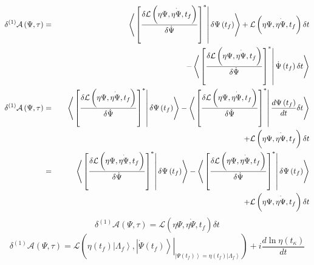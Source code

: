 \documentclass[aps,preprint]{revtex4}
\begin{document}
\begin{eqnarray}
\delta ^{\left( 1\right) }\mathcal{A}\left( \Psi ,\tau \right)
&=&\left\langle \left. \left[ \frac{\delta \mathcal{L}\left( \eta \Psi ,%
\overset{\cdot }{\eta \Psi },t_{f}\right) }{\delta \dot{\Psi}}\right] ^{\ast
}\right\vert \delta \Psi \left( t_{f}\right) \right\rangle +\mathcal{L}%
\left( \eta \Psi ,\overset{\cdot }{\eta \Psi },t_{f}\right) \delta t  \notag
\\
&&\qquad \qquad \qquad \qquad \qquad \qquad -\left\langle \left. \left[ 
\frac{\delta \mathcal{L}\left( \eta \Psi ,\overset{\cdot }{\eta \Psi }%
,t_{f}\right) }{\delta \dot{\Psi}}\right] ^{\ast }\right\vert \dot{\Psi}%
\left( t_{f}\right) \delta t\right\rangle  \notag \\
\delta ^{\left( 1\right) }\mathcal{A}\left( \Psi ,\tau \right)
&=&\left\langle \left. \left[ \frac{\delta \mathcal{L}\left( \eta \Psi ,%
\overset{\cdot }{\eta \Psi },t_{f}\right) }{\delta \dot{\Psi}}\right] ^{\ast
}\right\vert \delta \Psi \left( t_{f}\right) \right\rangle -\left\langle
\left. \left[ \frac{\delta \mathcal{L}\left( \eta \Psi ,\overset{\cdot }{%
\eta \Psi },t_{f}\right) }{\delta \dot{\Psi}}\right] ^{\ast }\right\vert 
\frac{d\Psi \left( t_{f}\right) }{dt}\delta t\right\rangle  \notag \\
&&\qquad \qquad \qquad \qquad \qquad \qquad \qquad \qquad \qquad \qquad
\qquad \qquad +\mathcal{L}\left( \eta \Psi ,\overset{\cdot }{\eta \Psi }%
,t_{f}\right) \delta t  \notag \\
&=&\left\langle \left. \left[ \frac{\delta \mathcal{L}\left( \eta \Psi ,%
\overset{\cdot }{\eta \Psi },t_{f}\right) }{\delta \dot{\Psi}}\right] ^{\ast
}\right\vert \delta \Psi \left( t_{f}\right) \right\rangle -\left\langle
\left. \left[ \frac{\delta \mathcal{L}\left( \eta \Psi ,\overset{\cdot }{%
\eta \Psi },t_{f}\right) }{\delta \dot{\Psi}}\right] ^{\ast }\right\vert
\delta \Psi \left( t_{f}\right) \right\rangle  \notag \\
&&\qquad \qquad \qquad \qquad \qquad \qquad \qquad \qquad \qquad \qquad
\qquad \qquad +\mathcal{L}\left( \eta \Psi ,\overset{\cdot }{\eta \Psi }%
,t_{f}\right) \delta t
\end{eqnarray}%
\begin{equation}
\delta ^{\left( 1\right) }\mathcal{A}\left( \Psi ,\tau \right) =\mathcal{L}%
\left( \eta \Psi ,\overset{\cdot }{\eta \Psi },t_{f}\right) \delta t
\end{equation}%
\begin{equation}
\delta ^{\left( 1\right) }\mathcal{A}\left( \Psi ,\tau \right) =\mathcal{L}%
\left( \eta \left( t_{f}\right) \left\vert \Lambda _{f}\right\rangle ,\left.
\left\vert \dot{\Psi}\left( t_{f}\right) \right\rangle \right\vert
_{\left\vert \Psi \left( t_{f}\right) \right\rangle =\eta \left(
t_{f}\right) \left\vert \Lambda _{f}\right\rangle }\right) +i\frac{d\ln \eta
\left( t_{\kappa }\right) }{dt}
\end{equation}%
\end{document}
